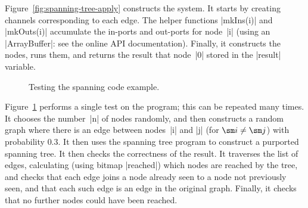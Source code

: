 
Figure~\ref{fig:spanning-tree-apply} constructs the system.  It starts by
creating channels corresponding to each edge.  The helper functions |mkIns(i)|
and |mkOuts(i)| accumulate the in-ports and out-ports for node~|i| (using an
|ArrayBuffer|: see the online API documentation).  Finally, it constructs the
nodes, runs them, and returns the result that node~|0| stored in the |result|
variable.


\begin{figure}
\caption{Testing the spanning code example.}
\label{fig:spanning-tree-test}
\end{figure}


Figure~\ref{fig:spanning-tree-test} performs a single test on the program;
this can be repeated many times.  It chooses the number~|n| of nodes randomly,
and then constructs a random graph where there is an edge between nodes~|i|
and |j| (for $\sm i \ne \sm j$) with probability $0.3$.  It then uses the
spanning tree program to construct a purported spanning tree.  It then checks
the correctness of the result.  It traverses the list of edges, calculating
(using bitmap |reached|) which nodes are reached by the tree, and checks that
each edge joins a node already seen to a node not previously seen, and that
each such edge is an edge in the original graph.  Finally, it checks
that no further nodes could have been reached.
